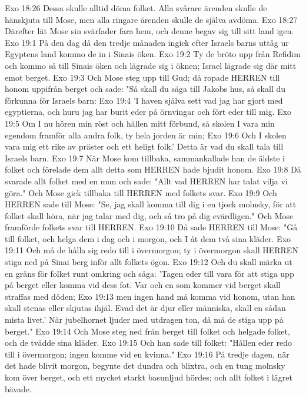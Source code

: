 Exo 18:26  Dessa skulle alltid döma folket. Alla svårare ärenden skulle de hänskjuta till Mose, men alla ringare ärenden skulle de själva avdöma.
Exo 18:27  Därefter lät Mose sin svärfader fara hem, och denne begav sig till sitt land igen.
Exo 19:1  På den dag då den tredje månaden ingick efter Israels barns uttåg ur Egyptens land kommo de in i Sinais öken.
Exo 19:2  Ty de bröto upp från Refidim och kommo så till Sinais öken och lägrade sig i öknen; Israel lägrade sig där mitt emot berget.
Exo 19:3  Och Mose steg upp till Gud; då ropade HERREN till honom uppifrån berget och sade: "Så skall du säga till Jakobs hus, så skall du förkunna för Israels barn:
Exo 19:4  'I haven själva sett vad jag har gjort med egyptierna, och huru jag har burit eder på örnvingar och fört eder till mig.
Exo 19:5  Om I nu hören min röst och hållen mitt förbund, så skolen I vara min egendom framför alla andra folk, ty hela jorden är min;
Exo 19:6  Och I skolen vara mig ett rike av präster och ett heligt folk.' Detta är vad du skall tala till Israels barn.
Exo 19:7  När Mose kom tillbaka, sammankallade han de äldste i folket och förelade dem allt detta som HERREN hade bjudit honom.
Exo 19:8  Då svarade allt folket med en mun och sade: "Allt vad HERREN har talat vilja vi göra." Och Mose gick tillbaka till HERREN med folkets svar.
Exo 19:9  Och HERREN sade till Mose: "Se, jag skall komma till dig i en tjock molnsky, för att folket skall höra, när jag talar med dig, och så tro på dig evärdligen." Och Mose framförde folkets svar till HERREN.
Exo 19:10  Då sade HERREN till Mose: "Gå till folket, och helga dem i dag och i morgon, och I åt dem två sina kläder.
Exo 19:11  Och må de hålla sig redo till i övermorgon; ty i övermorgon skall HERREN stiga ned på Sinai berg inför allt folkets ögon.
Exo 19:12  Och du skall märka ut en gräns för folket runt omkring och säga: 'Tagen eder till vara för att stiga upp på berget eller komma vid dess fot. Var och en som kommer vid berget skall straffas med döden;
Exo 19:13  men ingen hand må komma vid honom, utan han skall stenas eller skjutas ihjäl. Evad det är djur eller människa, skall en sådan mista livet.' När jubelhornet ljuder med utdragen ton, då må de stiga upp på berget."
Exo 19:14  Och Mose steg ned från berget till folket och helgade folket, och de tvådde sina kläder.
Exo 19:15  Och han sade till folket: "Hållen eder redo till i övermorgon; ingen komme vid en kvinna."
Exo 19:16  På tredje dagen, när det hade blivit morgon, begynte det dundra och blixtra, och en tung molnsky kom över berget, och ett mycket starkt basunljud hördes; och allt folket i lägret bävade.
